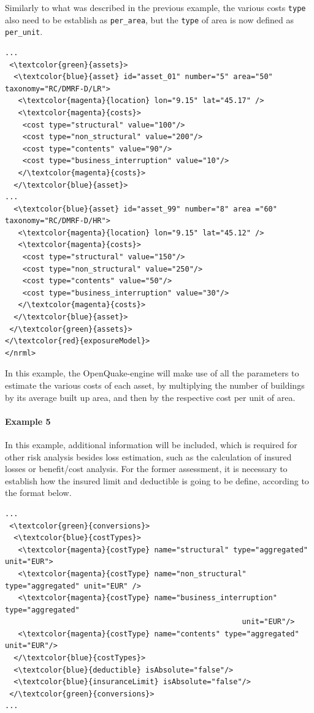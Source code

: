Similarly to what was described in the previous example, the various costs \Verb+type+ also need to be establish as \Verb+per_area+, but the \Verb+type+ of area is now defined as \Verb+per_unit+.

\begin{Verbatim}[frame=single, commandchars=\\\{\}, samepage=false]
...
 <\textcolor{green}{assets}>
  <\textcolor{blue}{asset} id="asset_01" number="5" area="50" taxonomy="RC/DMRF-D/LR">
   <\textcolor{magenta}{location} lon="9.15" lat="45.17" />
   <\textcolor{magenta}{costs}>
    <cost type="structural" value="100"/>
    <cost type="non_structural" value="200"/>
    <cost type="contents" value="90"/>
    <cost type="business_interruption" value="10"/>
   </\textcolor{magenta}{costs}>
  </\textcolor{blue}{asset}>
...
  <\textcolor{blue}{asset} id="asset_99" number="8" area ="60" taxonomy="RC/DMRF-D/HR">
   <\textcolor{magenta}{location} lon="9.15" lat="45.12" />
   <\textcolor{magenta}{costs}>
    <cost type="structural" value="150"/>
    <cost type="non_structural" value="250"/>
    <cost type="contents" value="50"/>
    <cost type="business_interruption" value="30"/>
   </\textcolor{magenta}{costs}>
  </\textcolor{blue}{asset}>
 </\textcolor{green}{assets}>
</\textcolor{red}{exposureModel}>
</nrml>
\end{Verbatim}

In this example, the OpenQuake-engine will make use of all the parameters to estimate the various costs of each asset, by multiplying the number of buildings by its average built up area, and then by the respective cost per unit of area.

\paragraph{Example 5}
In this example, additional information will be included, which is required for other risk analysis besides loss estimation, such as the calculation of insured losses or benefit/cost analysis. For the former assessment, it is necessary to establish how the insured limit and deductible is going to be define, according to the format below. 
\begin{Verbatim}[frame=single, commandchars=\\\{\}, samepage=false]
...
 <\textcolor{green}{conversions}>
  <\textcolor{blue}{costTypes}>
   <\textcolor{magenta}{costType} name="structural" type="aggregated" unit="EUR">
   <\textcolor{magenta}{costType} name="non_structural" type="aggregated" unit="EUR" />
   <\textcolor{magenta}{costType} name="business_interruption" type="aggregated" 
                                                      unit="EUR"/>
   <\textcolor{magenta}{costType} name="contents" type="aggregated" unit="EUR"/>
  </\textcolor{blue}{costTypes}>
  <\textcolor{blue}{deductible} isAbsolute="false"/>
  <\textcolor{blue}{insuranceLimit} isAbsolute="false"/>
 </\textcolor{green}{conversions}>
...
\end{Verbatim}

